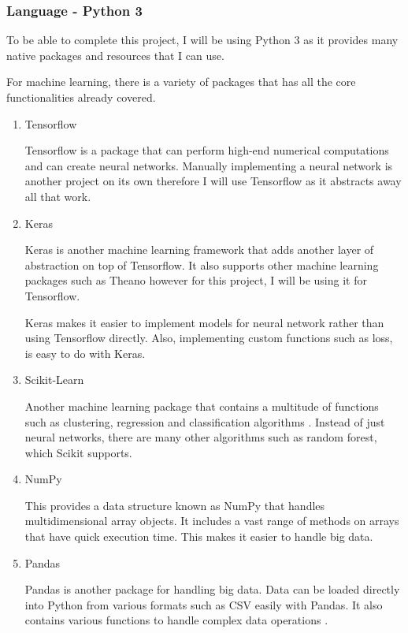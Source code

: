 \documentclass[11pt]{article}
\begin{document}
\subsubsection{Language - Python 3}
To be able to complete this project, I will be using Python 3 as it provides many native packages and resources that I can use.

For machine learning, there is a variety of packages that has all the core functionalities already covered.

\begin{enumerate}
  \item{Tensorflow}

  Tensorflow is a package that can perform high-end numerical computations \cite{bg-work-tensorflow} and can create neural networks. Manually implementing a neural network is another project on its own therefore I will use Tensorflow as it abstracts away all that work.

  \item{Keras}

  Keras is another machine learning framework that adds another layer of abstraction on top of Tensorflow. It also supports other machine learning packages such as Theano however for this project, I will be using it for Tensorflow. 

  Keras makes it easier to implement models for neural network rather than using Tensorflow directly. Also, implementing custom functions such as loss, is easy to do with Keras.
  \item{Scikit-Learn}

  Another machine learning package that contains a multitude of functions such as clustering, regression and classification algorithms \cite{bg-work-tensorflow}. Instead of just neural networks, there are many other algorithms such as random forest, which Scikit supports.

  \item{NumPy}

  This provides a data structure known as NumPy that handles multidimensional array objects. It includes a vast range of methods on arrays that have quick execution time. This makes it easier to handle big data.

  \item{Pandas}

  Pandas is another package for handling big data. Data can be loaded directly into Python from various formats such as CSV easily with Pandas. It also contains various functions to handle complex data operations \cite{bg-work-tensorflow}.


\end{enumerate}
\end{document}
